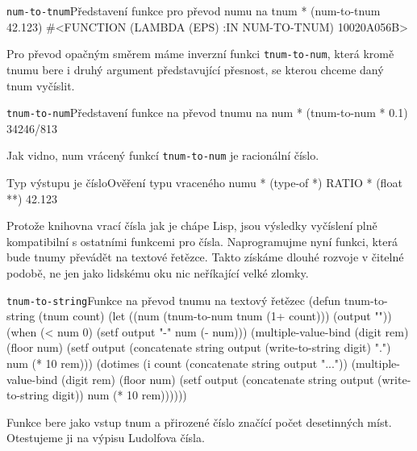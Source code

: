 \begin{lisptest}{\texttt{num-to-tnum}}{Představení funkce pro převod numu na tnum}
* (num-to-tnum 42.123)
#<FUNCTION (LAMBDA (EPS) :IN NUM-TO-TNUM) {10020A056B}>
\end{lisptest}

Pro převod opačným směrem máme inverzní funkci \texttt{tnum-to-num}, která kro\-mě tnumu bere i druhý argument představující přesnost, se kterou chceme daný tnum vyčíslit.

\begin{lisptest}{\texttt{tnum-to-num}}{Představení funkce na převod tnumu na num}
* (tnum-to-num * 0.1)
34246/813
\end{lisptest}

Jak vidno, num vrácený funkcí \texttt{tnum-to-num} je racionální číslo.

\begin{lisptest}{Typ výstupu je číslo}{Ověření typu vraceného numu}
* (type-of *)
RATIO
* (float **)
42.123
\end{lisptest}

Protože knihovna vrací čísla jak je chápe Lisp, jsou výsledky vyčíslení plně kompatibilní s ostatními funkcemi pro čísla. Naprogramujme nyní funkci, která bude tnumy převádět na textové řetězce. Takto získáme dlouhé rozvoje v čitelné podobě, ne jen jako lidskému oku nic neříkající velké zlomky.

\begin{lispcode}{\texttt{tnum-to-string}}{Funkce na převod tnumu na textový řetězec}
(\textcolor{funkcionalni}{defun} \textcolor{pojmenovan}{tnum-to-string} (tnum count)
  (\textcolor{vedlejsi}{let} ((num (\textcolor{moje}{tnum-to-num} tnum (\textcolor{matematicke}{1+} count))) (output ""))
    (\textcolor{funkcionalni}{when} (\textcolor{matematicke}{<} num 0) (\textcolor{vedlejsi}{setf} output "-" num (\textcolor{matematicke}{-} num)))
    (\textcolor{matematicke}{multiple-value-bind} (digit rem)
        (\textcolor{matematicke}{floor} num)
        (\textcolor{vedlejsi}{setf} output (\textcolor{matematicke}{concatenate} \textquotesingle\textcolor{moje}{string} output 
              (\textcolor{funkcionalni}{write-to-string} digit) ".")
          num (\textcolor{matematicke}{*} 10 rem)))
    (\textcolor{funkcionalni}{dotimes} (i count (\textcolor{matematicke}{concatenate} \textquotesingle\textcolor{moje}{string} output "..."))
      (\textcolor{matematicke}{multiple-value-bind} (digit rem)
        (\textcolor{matematicke}{floor} num)
        (\textcolor{vedlejsi}{setf} output (\textcolor{matematicke}{concatenate} \textquotesingle\textcolor{moje}{string} output 
              (\textcolor{funkcionalni}{write-to-string} digit))
          num (\textcolor{matematicke}{*} 10 rem))))))
\end{lispcode}
Funkce bere jako vstup tnum a přirozené číslo značící počet desetinných míst. Otestujeme ji na výpisu Ludolfova čísla.


